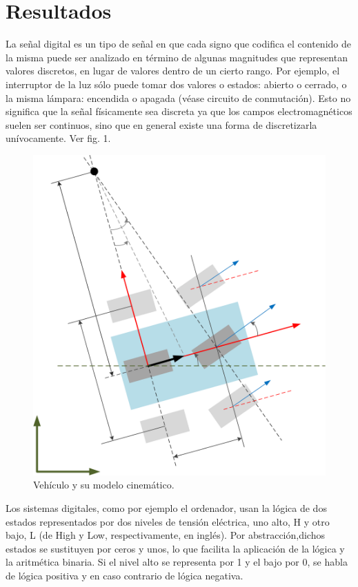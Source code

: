 \documentclass[conference,compsoc,onecolumn]{IEEEtran}
\begin{document}
\section{Resultados}
\label{sec:results}
La señal digital es un tipo de señal en que cada signo que codifica el contenido de la misma puede ser analizado
en término de algunas magnitudes que representan valores discretos, en lugar de valores dentro de un cierto rango.
Por ejemplo, el interruptor de la luz sólo puede tomar dos valores o estados: abierto o cerrado, o la misma lámpara:
encendida o apagada (véase circuito de conmutación). Esto no significa que la señal físicamente sea discreta ya que los
campos electromagnéticos suelen ser continuos, sino que en general existe una forma de discretizarla unívocamente.
Ver fig. 1.
 \begin{figure}[h!]
\centering
\includegraphics[scale=0.5]{bib/.png}
\caption{Vehículo y su modelo cinemático.}
\label{fig:imagen laboratorio 1}
\end{figure}

Los sistemas digitales, como por ejemplo el ordenador, usan la lógica de dos estados representados por dos
niveles de tensión eléctrica, uno alto, H y otro bajo, L (de High y Low, respectivamente, en inglés). Por abstracción,dichos estados se sustituyen por ceros y unos, lo que facilita la aplicación de la lógica y la aritmética binaria. Si el
nivel alto se representa por 1 y el bajo por 0, se habla de lógica positiva y en caso contrario de lógica negativa.
\end{document}
